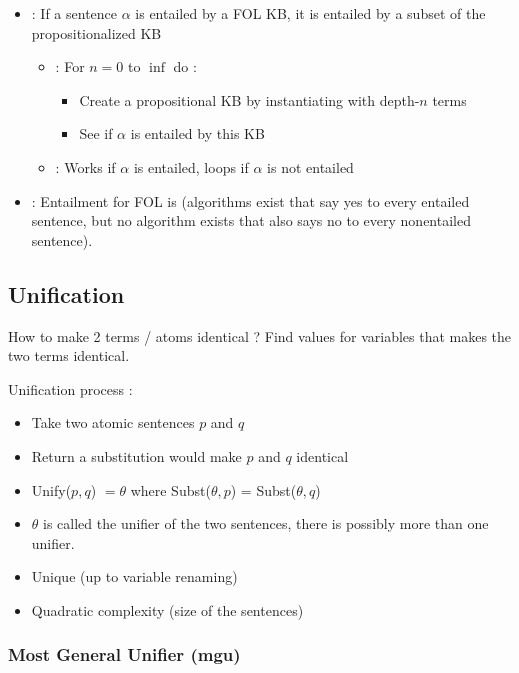 \begin{itemize}
\item {} : If a sentence $\alpha$ is entailed by a FOL KB, it is entailed by a  subset of the propositionalized KB
	\begin{itemize}
	\item {} : For $n = 0$ to $\inf$ do :
		\begin{itemize}
		\item Create a propositional KB by instantiating with depth-$n$ terms
		\item See if $\alpha$ is entailed by this KB
		\end{itemize}
	\item {} : Works if $\alpha$ is entailed, loops if $\alpha$ is not entailed
	\end{itemize}
\item {} : Entailment for FOL is  (algorithms exist that say yes to every entailed sentence, but no algorithm exists that also says no to every nonentailed sentence).
\end{itemize}

\subsection{Unification}

How to make 2 terms / atoms identical ? Find values for variables that makes the two terms identical.

Unification process : 
\begin{itemize}
\item Take two atomic sentences $p$ and $q$
\item Return a substitution would make $p$ and $q$ identical
\item Unify($p,q$) $= \theta$ where Subst($\theta, p$) = Subst($\theta, q$)
\item $\theta$ is called the unifier of the two sentences, there is possibly more than one unifier.
\item Unique  (up to variable renaming)
\item Quadratic complexity (size of the sentences)
\end{itemize}

\newpage
\subsubsection{Most General Unifier (mgu)}

